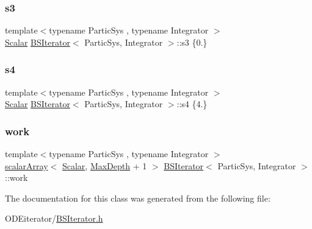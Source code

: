 \mbox{\label{class_b_s_iterator_a10ea0bb96f7971e9c477daef1fda6e16}} 
\subsubsection{\texorpdfstring{s3}{s3}}
{\footnotesize\ttfamily template$<$typename Partic\+Sys , typename Integrator $>$ \\
\mbox{\hyperlink{class_b_s_iterator_a7857f8ff9032955ea4dcc22cd18ca7a1}{Scalar}} \mbox{\hyperlink{class_b_s_iterator}{B\+S\+Iterator}}$<$ Partic\+Sys, Integrator $>$\+::s3 \{0.\}\hspace{0.3cm}{\ttfamily [private]}}

\mbox{\label{class_b_s_iterator_a5b3bbb2d988a5d91030060508e3b4f66}} 
\subsubsection{\texorpdfstring{s4}{s4}}
{\footnotesize\ttfamily template$<$typename Partic\+Sys , typename Integrator $>$ \\
\mbox{\hyperlink{class_b_s_iterator_a7857f8ff9032955ea4dcc22cd18ca7a1}{Scalar}} \mbox{\hyperlink{class_b_s_iterator}{B\+S\+Iterator}}$<$ Partic\+Sys, Integrator $>$\+::s4 \{4.\}\hspace{0.3cm}{\ttfamily [private]}}

\mbox{\label{class_b_s_iterator_ac2a338d6c3e5014d529666032d34c987}} 
\subsubsection{\texorpdfstring{work}{work}}
{\footnotesize\ttfamily template$<$typename Partic\+Sys , typename Integrator $>$ \\
\mbox{\hyperlink{class_b_s_iterator_ab0aa7c10b56500273af05dcd85fd8389}{scalar\+Array}}$<$ \mbox{\hyperlink{class_b_s_iterator_a7857f8ff9032955ea4dcc22cd18ca7a1}{Scalar}}, \mbox{\hyperlink{class_b_s_iterator_a39409b9a12d4854d101ce59a0efc0f74}{Max\+Depth}} + 1 $>$ \mbox{\hyperlink{class_b_s_iterator}{B\+S\+Iterator}}$<$ Partic\+Sys, Integrator $>$\+::work\hspace{0.3cm}{\ttfamily [private]}}



The documentation for this class was generated from the following file\+:\begin{DoxyCompactItemize}
\item 
O\+D\+Eiterator/\mbox{\hyperlink{_b_s_iterator_8h}{B\+S\+Iterator.\+h}}\end{DoxyCompactItemize}
